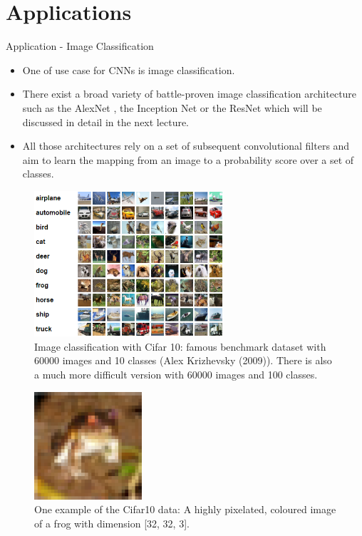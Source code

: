 \section{Applications}
\begin{vbframe}{Application - Image Classification}
    \begin{itemize}
        \item One of use case for CNNs is image classification.
        \item There exist a broad variety of battle-proven image classification architecture such as the AlexNet , the Inception Net or the ResNet which will be discussed in detail in the next lecture.
        \item All those architectures rely on a set of subsequent convolutional filters and aim to learn the mapping from an image to a probability score over a set of classes.
    \end{itemize}
\framebreak
    \begin{figure}
        \centering
        \includegraphics[width=7cm]{plots/01_introduction/recognition.png}
        \caption{Image classification with Cifar 10: famous benchmark dataset with 60000 images and 10 classes (Alex Krizhevsky (2009)). There is also a much more difficult version with 60000 images and 100 classes.}
    \end{figure}
\framebreak
    \begin{figure}
        \centering
        \includegraphics[width=4cm]{plots/application/cifar_frog.png}
        \caption{One example of the Cifar10 data: A highly pixelated, coloured image of a frog with dimension [32, 32, 3]. }

\end{figure}
\end{vbframe}
